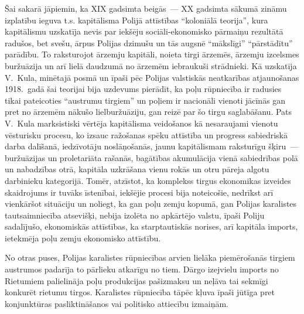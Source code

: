 \documentclass[twoside,a5paper,12pt,fleqn,openany]{extbook}
\begin{document}
Šai sakarā jāpiemin, ka XIX gadsimta beigās~--- XX gadsimta sākumā zināmu izplatību ieguva t.s. kapitālisma Polijā attīstības ``koloniālā teorija'', kura kapitālismu uzskatīja nevis par iekšēju sociāli-ekonomisko pārmaiņu rezultātā radušos, bet svešu, ārpus Polijas dzimušu un tās augsnē ``mākslīgi'' ``pārstādītu'' parādību. To raksturojot ārzemju kapitāli, noieta tirgi ārzemēs, ārzemju izcelsmes buržuāzija un arī lielā daudzumā no ārzemēm iebraukuši strādnieki. Kā uzskatīja V.~Kula, minētajā posmā un īpaši pēc Polijas valstiskās neatkarības atjaunošanas 1918.~gadā šai teorijai bija uzdevums pierādīt, ka poļu rūpniecība ir radusies tikai pateicoties ``austrumu tirgiem'' un poļiem ir nacionāli vienoti jācīnās gan pret no ārzemēm nākušo lielburžuāziju, gan reizē par šo tirgu saglabāšanu. Pats V.~Kula marksistiski vērtēja kapitālisma veidošanos kā nesaraujami vienotu vēsturisku procesu, ko izsauc ražošanas spēku attīstība un progress sabiedriskā darba dalīšanā, iedzīvotāju noslāņošanās, jaunu kapitālismam raksturīgu šķiru~--- buržuāzijas un proletariāta rašanās, bagātības akumulācija vienā sabiedrības polā un nabadzības otrā, kapitāla uzkrāšana vienu rokās un otru pāreja algotu darbinieku kategorijā. Tomēr, atzīstot, ka komplekss tirgus ekonomikas izveides skaidrojums ir tuvāks īstenībai, iekšējie procesi bija noteicošie, nedrīkst arī vienkāršot situāciju un noliegt, ka gan poļu zemju kopumā, gan Polijas karalistes tautsaimniecība atsevišķi, nebija izolēta no apkārtējo valstu, īpaši Poliju sadalījušo, ekonomiskās attīstības, ka starptautiskās norises, arī kapitāla imports, ietekmēja poļu zemju ekonomisko attīstību.

No otras puses, Polijas karalistes rūpniecības arvien lielāka piemērošanās tirgiem austrumos padarīja to pārlieku atkarīgu no tiem. Dārgo izejvielu imports no Rietumiem palielināja poļu produkcijas pašizmaksu un neļāva tai sekmīgi konkurēt rietumu tirgos. Karalistes rūpniecība tāpēc kļuva īpaši jūtīga pret konjunktūras pasliktināšanos vai politisko attiecību izmaiņām.
\end{document}
